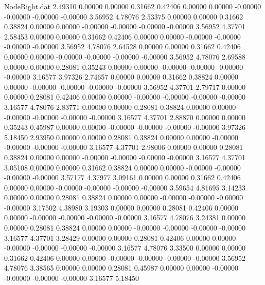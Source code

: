 \begin{filecontents}{NodeRight.dat}
   2.49310    0.00000    0.00000     0.31662    0.42406    0.00000    0.00000   -0.00000   -0.00000   -0.00000   -0.00000    3.56952    4.78076
   2.53375    0.00000    0.00000     0.31662    0.38824    0.00000    0.00000   -0.00000   -0.00000   -0.00000   -0.00000    3.56952    4.37701
   2.58453    0.00000    0.00000     0.31662    0.42406    0.00000    0.00000   -0.00000   -0.00000   -0.00000   -0.00000    3.56952    4.78076
   2.64528    0.00000    0.00000     0.31662    0.42406    0.00000    0.00000   -0.00000   -0.00000   -0.00000   -0.00000    3.56952    4.78076
   2.69588    0.00000    0.00000     0.28081    0.35243    0.00000    0.00000   -0.00000   -0.00000   -0.00000   -0.00000    3.16577    3.97326
   2.74657    0.00000    0.00000     0.31662    0.38824    0.00000    0.00000   -0.00000   -0.00000   -0.00000   -0.00000    3.56952    4.37701
   2.79717    0.00000    0.00000     0.28081    0.42406    0.00000    0.00000   -0.00000   -0.00000   -0.00000   -0.00000    3.16577    4.78076
   2.83771    0.00000    0.00000     0.28081    0.38824    0.00000    0.00000   -0.00000   -0.00000   -0.00000   -0.00000    3.16577    4.37701
   2.88870    0.00000    0.00000     0.35243    0.45987    0.00000    0.00000   -0.00000   -0.00000   -0.00000   -0.00000    3.97326    5.18450
   2.93950    0.00000    0.00000     0.28081    0.38824    0.00000    0.00000   -0.00000   -0.00000   -0.00000   -0.00000    3.16577    4.37701
   2.98006    0.00000    0.00000     0.28081    0.38824    0.00000    0.00000   -0.00000   -0.00000   -0.00000   -0.00000    3.16577    4.37701
   3.05108    0.00000    0.00000     0.31662    0.38824    0.00000    0.00000   -0.00000   -0.00000   -0.00000   -0.00000    3.57177    4.37977
   3.09161    0.00000    0.00000     0.31662    0.42406    0.00000    0.00000   -0.00000   -0.00000   -0.00000   -0.00000    3.59654    4.81695
   3.14233    0.00000    0.00000     0.28081    0.38824    0.00000    0.00000   -0.00000   -0.00000   -0.00000   -0.00000    3.17502    4.38980
   3.19303    0.00000    0.00000     0.28081    0.42406    0.00000    0.00000   -0.00000   -0.00000   -0.00000   -0.00000    3.16577    4.78076
   3.24381    0.00000    0.00000     0.28081    0.38824    0.00000    0.00000   -0.00000   -0.00000   -0.00000   -0.00000    3.16577    4.37701
   3.28429    0.00000    0.00000     0.28081    0.42406    0.00000    0.00000   -0.00000   -0.00000   -0.00000   -0.00000    3.16577    4.78076
   3.33500    0.00000    0.00000     0.31662    0.42406    0.00000    0.00000   -0.00000   -0.00000   -0.00000   -0.00000    3.56952    4.78076
   3.38565    0.00000    0.00000     0.28081    0.45987    0.00000    0.00000   -0.00000   -0.00000   -0.00000   -0.00000    3.16577    5.18450

\end{filecontents}
